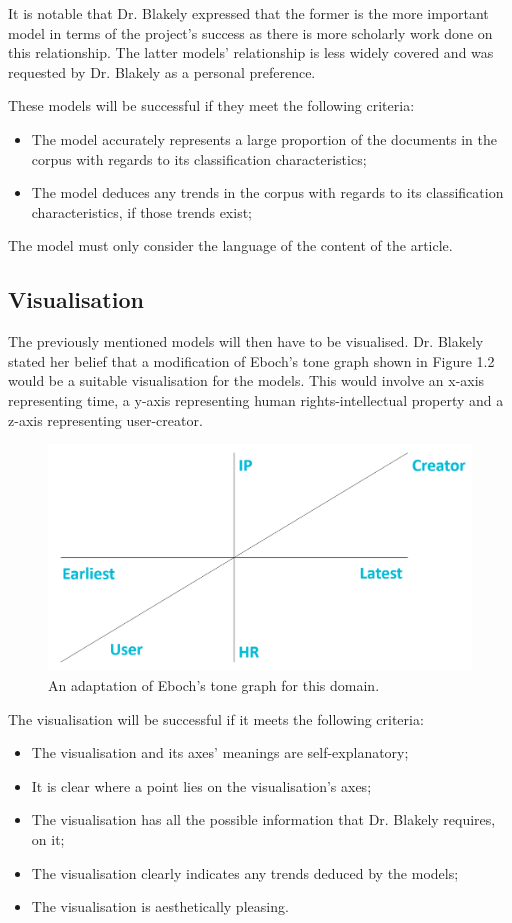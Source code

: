 			It is notable that Dr. Blakely expressed that the former is the more important model in terms of the project’s success as there is more scholarly work done on this relationship. The latter models’ relationship is less widely covered and was requested by Dr. Blakely as a personal preference. 

			These models will be successful if they meet the following criteria: 
			\begin{itemize}
				\item The model accurately represents a large proportion of the documents in the corpus with regards to its classification characteristics; 
				\item The model deduces any trends in the corpus with regards to its classification characteristics, if those trends exist; 
			\end{itemize}
			
			The model must only consider the language of the content of the article. 
		\subsection{Visualisation}
			The previously mentioned models will then have to be visualised. Dr. Blakely stated her belief that a modification of Eboch’s tone graph\cite{tone_graph_eboch} shown in Figure 1.2 would be a suitable visualisation for the models. This would involve an x-axis representing time, a y-axis representing human rights-intellectual property and a z-axis representing user-creator. 
			
			\begin{figure}[h]
    			\centering
    			\includegraphics[width=0.5\linewidth]{resources/images/eboch_adapt.png}
    			\caption{An adaptation of Eboch’s tone graph for this domain.}
    			\label{fig:eboch_adapt}
			\end{figure}
			
			The visualisation will be successful if it meets the following criteria:
			\begin{itemize}
				\item The visualisation and its axes’ meanings are self-explanatory; 
    			\item It is clear where a point lies on the visualisation’s axes; 
    			\item The visualisation has all the possible information that Dr. Blakely requires, on it; 
    			\item The visualisation clearly indicates any trends deduced by the models; 
    			\item The visualisation is aesthetically pleasing. 
			\end{itemize}
			
